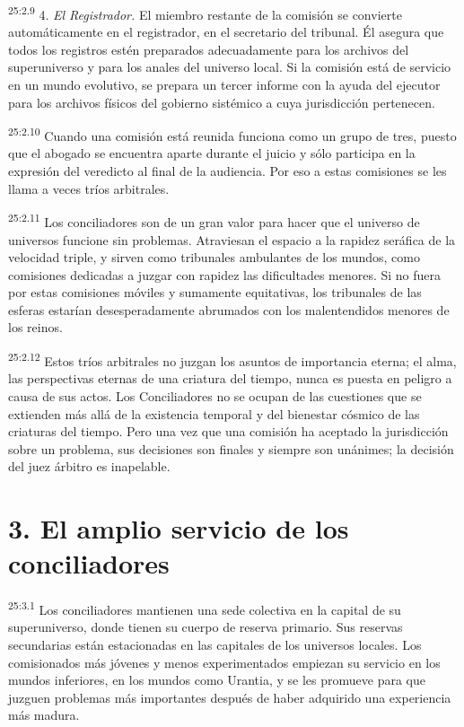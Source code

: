 \par
\textsuperscript{25:2.9} 4. \textit{El Registrador.} El miembro restante de la comisión se convierte automáticamente en el registrador, en el secretario del tribunal. Él asegura que todos los registros estén preparados adecuadamente para los archivos del superuniverso y para los anales del universo local. Si la comisión está de servicio en un mundo evolutivo, se prepara un tercer informe con la ayuda del ejecutor para los archivos físicos del gobierno sistémico a cuya jurisdicción pertenecen.

\par
\textsuperscript{25:2.10} Cuando una comisión está reunida funciona como un grupo de tres, puesto que el abogado se encuentra aparte durante el juicio y sólo participa en la expresión del veredicto al final de la audiencia. Por eso a estas comisiones se les llama a veces tríos arbitrales.

\par
\textsuperscript{25:2.11} Los conciliadores son de un gran valor para hacer que el universo de universos funcione sin problemas. Atraviesan el espacio a la rapidez seráfica de la velocidad triple, y sirven como tribunales ambulantes de los mundos, como comisiones dedicadas a juzgar con rapidez las dificultades menores. Si no fuera por estas comisiones móviles y sumamente equitativas, los tribunales de las esferas estarían desesperadamente abrumados con los malentendidos menores de los reinos.

\par
\textsuperscript{25:2.12} Estos tríos arbitrales no juzgan los asuntos de importancia eterna; el alma, las perspectivas eternas de una criatura del tiempo, nunca es puesta en peligro a causa de sus actos. Los Conciliadores no se ocupan de las cuestiones que se extienden más allá de la existencia temporal y del bienestar cósmico de las criaturas del tiempo. Pero una vez que una comisión ha aceptado la jurisdicción sobre un problema, sus decisiones son finales y siempre son unánimes; la decisión del juez árbitro es inapelable.

\section*{3. El amplio servicio de los conciliadores}
\par
\textsuperscript{25:3.1} Los conciliadores mantienen una sede colectiva en la capital de su superuniverso, donde tienen su cuerpo de reserva primario. Sus reservas secundarias están estacionadas en las capitales de los universos locales. Los comisionados más jóvenes y menos experimentados empiezan su servicio en los mundos inferiores, en los mundos como Urantia, y se les promueve para que juzguen problemas más importantes después de haber adquirido una experiencia más madura.

